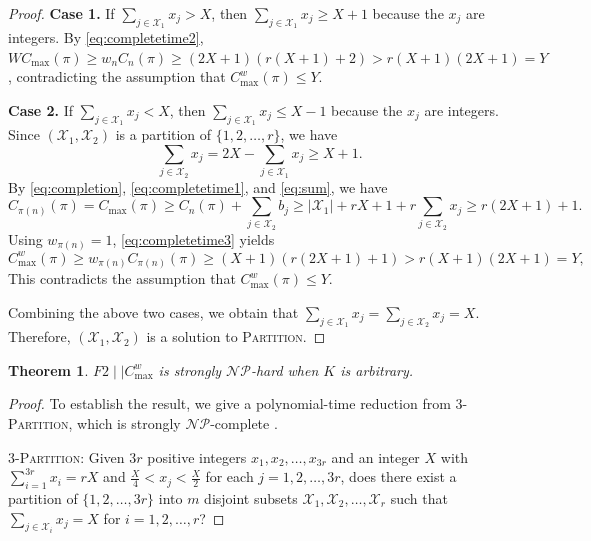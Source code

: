 ﻿\documentclass[12pt]{article} \textheight=24.5cm \textwidth=16.5cm \parskip = 0.165cm
\newtheorem{theorem}{Theorem}[section]
\begin{document}
\begin{sloppypar}
\begin{proof}
        \textbf{Case 1.} If $\sum_{j \in \mathcal{X}_1} x_j > X$, then $\sum_{j \in \mathcal{X}_1} x_j \geq X+1$ because the $x_j$ are integers.
        By \cref{eq:completetime2}, $W C_{\max}(\pi) \geq w_n C_n(\pi) \geq (2X+1) (r(X+1)+2) >r(X+1)(2X+1)=Y$, contradicting the assumption that $C_{\max}^w(\pi) \leq Y$.

        \textbf{Case 2.} If $\sum_{j \in \mathcal{X}_1} x_j < X$, then $\sum_{j \in \mathcal{X}_1} x_j \leq X-1$ because the $x_j$ are integers.
        Since $(\mathcal{X}_1, \mathcal{X}_2)$ is a partition of $\{1, 2, \ldots, r\}$, we have
            \begin{equation} \label{eq:sum}
                \sum_{j \in \mathcal{X}_2} x_j =2X-\sum_{j \in \mathcal{X}_1} x_j \geq X+1.
            \end{equation}
        By \cref{eq:completion}, \cref{eq:completetime1}, and \cref{eq:sum}, we have
            \begin{equation}\label{eq:completetime3}
                C_{\pi(n)}(\pi)=C_{\max}(\pi) \geq C_n(\pi)+\sum_{j \in \mathcal{X}_2} b_j \geq |\mathcal{X}_1| +r X + 1+ r \sum_{j \in \mathcal{X}_2} x_j \geq r (2X + 1)+1.
            \end{equation}
        Using $w_{\pi(n)}=1$, \cref{eq:completetime3} yields
            \begin{equation*}
                C_{\max}^w(\pi) \geq w_{\pi(n)} C_{\pi(n)}(\pi) \geq (X+1) (r(2X+1)+1) >r(X+1)(2X+1)=Y,
            \end{equation*}
        This contradicts the assumption that $C_{\max}^w(\pi) \leq Y$.

        Combining the above two cases, we obtain that $\sum_{j \in \mathcal{X}_1} x_j = \sum_{j \in \mathcal{X}_2} x_j= X$.
        Therefore, $(\mathcal{X}_1, \mathcal{X}_2)$ is a solution to \textsc{Partition}.
        \end{proof}

        \begin{theorem}\label{thm:snphard}
        $F2 \mid \mid C_{\max}^w$ is strongly $\mathcal{NP}$-hard when $K$ is arbitrary.
        \end{theorem}
        \begin{proof}
        To establish the result, we give a polynomial-time reduction from 3-\textsc{Partition}, which is strongly  $\mathcal{NP}$-complete \citep{GareyJohnson1979computer}.

        3-\textsc{Partition}: Given $3r$ positive integers $x_1, x_2, \ldots, x_{3r}$ and an integer $X$ with $\sum_{i=1}^{3r}x_i=rX$ and $\frac{X}{4} < x_j < \frac{X}{2}$ for each $j=1, 2, \ldots, 3r$, does there exist a partition of $\{1, 2, \ldots, 3r\}$ into $m$ disjoint subsets $\mathcal{X}_1, \mathcal{X}_2, \ldots, \mathcal{X}_r$ such that $\sum_{j \in \mathcal{X}_i} x_j=X$ for $i=1, 2, \ldots, r$?


\end{proof}
\end{sloppypar}
\end{document}
